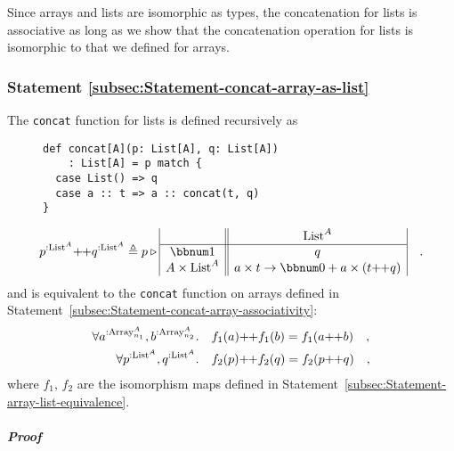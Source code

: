 Since arrays and lists are isomorphic as types, the concatenation
for lists is associative as long as we show that the concatenation
operation for lists is isomorphic to that we defined for arrays.

\subsubsection{Statement \label{subsec:Statement-concat-array-as-list}\ref{subsec:Statement-concat-array-as-list}}

The \lstinline!concat! function for lists is defined recursively
as

\begin{wrapfigure}{l}{0.38\columnwidth}%
\vspace{-0.75\baselineskip}
\begin{lstlisting}
def concat[A](p: List[A], q: List[A])
    : List[A] = p match {
  case List() => q
  case a :: t => a :: concat(t, q)
}
\end{lstlisting}

\vspace{-1.25\baselineskip}
\end{wrapfigure}%

\noindent \vspace{-1.9\baselineskip}

\[
p^{:\text{List}^{A}}\negmedspace+\negthickspace+q^{:\text{List}^{A}}\triangleq p\triangleright\begin{array}{|c||c|}
 & \text{List}^{A}\\
\hline \bbnum 1 & q\\
A\times\text{List}^{A} & a\times t\rightarrow\bbnum 0+a\times(t\negmedspace+\negthickspace+q)
\end{array}\quad.
\]
and is equivalent to the \lstinline!concat! function on arrays defined
in Statement~\ref{subsec:Statement-concat-array-associativity}:
\begin{align*}
\forall a^{:\text{Array}_{n_{1}}^{A}},b^{:\text{Array}_{n_{2}}^{A}}.\quad & f_{1}(a)\negmedspace+\negthickspace+f_{1}(b)=f_{1}(a\negmedspace+\negthickspace+b)\quad,\\
\forall p^{:\text{List}^{A}},q^{:\text{List}^{A}}.\quad & f_{2}(p)\negmedspace+\negthickspace+f_{2}(q)=f_{2}(p\negmedspace+\negthickspace+q)\quad,
\end{align*}
where $f_{1}$, $f_{2}$ are the isomorphism maps defined in Statement~\ref{subsec:Statement-array-list-equivalence}.

\subparagraph{Proof}

